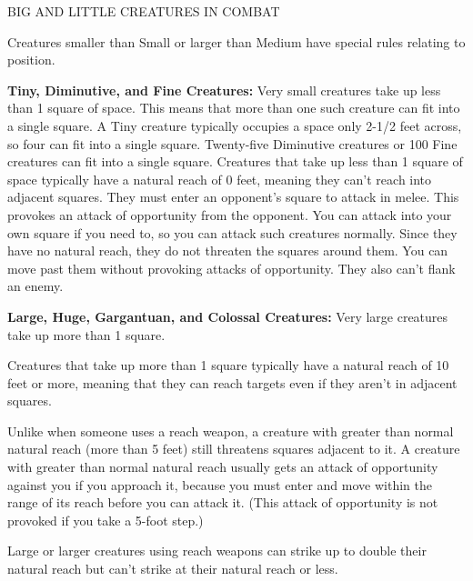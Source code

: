 \documentclass{article}
\begin{document}
\vspace{12pt}
BIG AND LITTLE CREATURES IN COMBAT

Creatures smaller than Small or larger than Medium have special rules relating 
to position. 

\textbf{Tiny, Diminutive, and Fine Creatures:} Very small creatures take up less 
than 1 square of space. This means that more than one such creature can fit into 
a single square. A Tiny creature typically occupies a space only 2-1/2 feet across, 
so four can fit into a single square. Twenty-five Diminutive creatures or 100 Fine 
creatures can fit into a single square. Creatures that take up less than 1 square 
of space typically have a natural reach of 0 feet, meaning they can't reach into 
adjacent squares. They must enter an opponent's square to attack in melee. This 
provokes an attack of opportunity from the opponent. You can attack into your own 
square if you need to, so you can attack such creatures normally. Since they have 
no natural reach, they do not threaten the squares around them. You can move past 
them without provoking attacks of opportunity. They also can't flank an enemy.

\textbf{Large, Huge, Gargantuan, and Colossal Creatures:} Very large creatures 
take up more than 1 square.

Creatures that take up more than 1 square typically have a natural reach of 10 
feet or more, meaning that they can reach targets even if they aren't in adjacent 
squares.

Unlike when someone uses a reach weapon, a creature with greater than normal natural 
reach (more than 5 feet) still threatens squares adjacent to it. A creature with 
greater than normal natural reach usually gets an attack of opportunity against 
you if you approach it, because you must enter and move within the range of its 
reach before you can attack it. (This attack of opportunity is not provoked if 
you take a 5-foot step.)

Large or larger creatures using reach weapons can strike up to double their natural 
reach but can't strike at their natural reach or less. 
\end{document}
